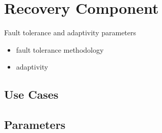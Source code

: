 
\section{Recovery Component} \label{s:component-recovery}

Fault tolerance and adaptivity parameters

\begin{itemize}
\item fault tolerance methodology
\item adaptivity
\end{itemize}

\subsection{Use Cases}
\subsection{Parameters}
